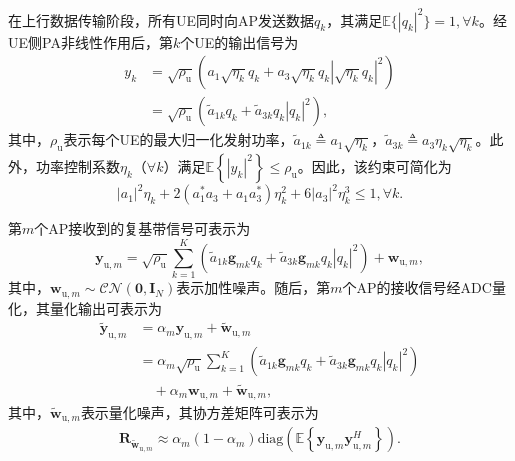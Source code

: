 在上行数据传输阶段，所有UE同时向AP发送数据$q_k$，其满足$\mathbb{E}\{|q_k|^2\}=1,\forall k$。经UE侧PA非线性作用后，第$k$个UE的输出信号为
\begin{align}
\label{eqn-9}{y_k} &= \sqrt {{\rho _\text{u}}} \left( {{a_1}\sqrt {{\eta _k}} {q_k} + {a_3}\sqrt {{\eta _k}} {q_k}{{\left| {\sqrt {{\eta _k}} {q_k}} \right|}^2}} \right)\nonumber\\
&= \sqrt {{\rho _\text{u}}} \left( {{\tilde{a}_{1k}}{q_k} + {\tilde{a}_{3k}}{q_k}{{\left| {{q_k}} \right|}^2}} \right),
\end{align}
其中，$\rho_\text{u}$表示每个UE的最大归一化发射功率，$\tilde{a}_{1k} \triangleq a_1\sqrt{\eta_k}$，$\tilde{a}_{3k} \triangleq a_3\eta_k\sqrt{\eta_k}$。此外，功率控制系数$\eta_k$（$\forall k$）满足$\mathbb{E}\left\{|y_k|^2\right\} \le \rho_\text{u}$。因此，该约束可简化为
\begin{equation}\label{eqn-10}
{\left| {{a_1}} \right|^2}{\eta _k} + 2(a_1^ * {a_3} + {a_1}a_3^ * )\eta _k^2 + 6{\left| {{a_3}} \right|^2}\eta _k^3 \le 1,  \forall k.
\end{equation}

第$m$个AP接收到的复基带信号可表示为
\begin{equation}\label{eqn-11}
{{\mathbf{y}}_{\text{u},m}} = \sqrt {{\rho _\text{u}}} \sum_{k = 1}^K ({\tilde{a}_{1k}}{{\mathbf{g}}_{mk}}{q_k} + {\tilde{a}_{3k}}{{\mathbf{g}}_{mk}}{q_k}{\left| {{q_k}} \right|^2}) + {\mathbf{w}}_{\text{u},m},
\end{equation}
其中，$\mathbf{w}_{\text{u},m}\sim \mathcal{CN}(\mathbf{0},\mathbf{I}_N)$表示加性噪声。随后，第$m$个AP的接收信号经ADC量化，其量化输出可表示为
\begin{align}\label{eqn-12}{\tilde{\mathbf y}_{\text{u},m}} &= {\alpha _m}{{\mathbf{y}}_{\text{u},m}} + {{\mathbf{\tilde w}}_{\text{u},m}} \nonumber\\
&= {\alpha _m}\sqrt {{\rho _\text{u}}} \sum_{k = 1}^K ({\tilde{a}_{1k}}{{\mathbf{g}}_{mk}}{q_k} + {\tilde{a}_{3k}}{{\mathbf{g}}_{mk}}{q_k}{\left| {{q_k}} \right|^2}) \nonumber\\
&\quad + {\alpha _m}{{\mathbf{w}}_{\text{u},m}} + {{\tilde{\mathbf w}}_{\text{u},m}},
\end{align}
其中，${{\tilde{\mathbf w}}_{\text{u},m}}$表示量化噪声，其协方差矩阵可表示为
\begin{align}{\mathbf{R}_{{\mathbf{\tilde w}_{\text{u},m}}}} \approx {\alpha _m}(1 - {\alpha _m})\text{diag}(\mathbb{E}\left\{ {{{\mathbf{y}}_{\text{u},m}}{\mathbf{y}}_{\text{u},m}^H} \right\}).\end{align}

